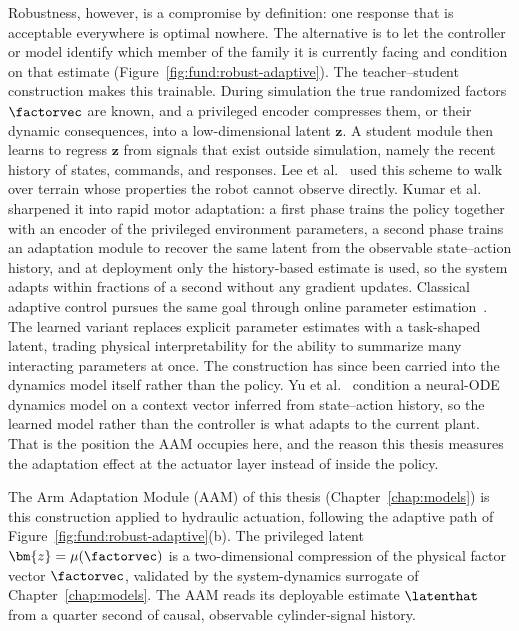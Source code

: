 Robustness, however, is a compromise by definition: one response that is
acceptable everywhere is optimal nowhere. The alternative is to let the
controller or model identify which member of the family it is currently
facing and condition on that estimate
(Figure~\ref{fig:fund:robust-adaptive}). The teacher--student
construction makes this trainable. During simulation the true randomized
factors $\factorvec$ are known, and a privileged encoder compresses
them, or their dynamic consequences, into a low-dimensional latent
$\bm{z}$. A
student module then learns to regress $\bm{z}$ from signals that exist
outside simulation, namely the recent history of states, commands, and
responses. Lee et al.~\cite{lee2020learning} used this scheme to walk
over terrain whose properties the robot cannot observe directly. Kumar
et al.~\cite{kumar2021rma} sharpened it into rapid motor adaptation:
a first phase trains the policy together with an encoder of the
privileged environment parameters, a second phase trains an adaptation
module to recover the same latent from the observable state--action
history, and at deployment only the history-based estimate is used, so
the system adapts within fractions of a second without any gradient
updates. Classical adaptive control pursues the same goal through online
parameter estimation~\cite{astrom1995adaptive}. The learned variant
replaces explicit parameter estimates with a task-shaped latent, trading
physical interpretability for the ability to summarize many interacting
parameters at once. The construction has since been carried into the
dynamics model itself rather than the policy. Yu et
al.~\cite{yu2026context} condition a neural-ODE dynamics model on a
context vector inferred from state--action history, so the learned model
rather than the controller is what adapts to the current plant. That is
the position the AAM occupies here, and the reason this thesis measures
the adaptation effect at the actuator layer instead of inside the
policy.

The Arm Adaptation Module (AAM) of this thesis
(Chapter~\ref{chap:models}) is this construction applied to hydraulic
actuation, following the adaptive path of
Figure~\ref{fig:fund:robust-adaptive}(b). The privileged latent
$\bm{z} = \mu(\factorvec)$ is a two-dimensional compression of the
physical factor vector $\factorvec$, validated by the system-dynamics
surrogate of Chapter~\ref{chap:models}. The AAM reads its deployable
estimate $\latenthat$ from a quarter second of causal, observable
cylinder-signal history.

